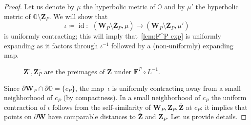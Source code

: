 \documentclass{amsart}
\renewcommand{\sp}{{\ \ }}
\newcommand{\1}{{\mathbb 1 }}
\newcommand{\bO}{{\mathbb{O}}}
\newcommand{\bF}{{\mathbf F}}
\newcommand{\bZ}{{\mathbf Z}}
\newcommand{\bW}{{\mathbf W}}
\newcommand{\bR}{{\mathbf R}}
\theoremstyle{remark}
\numberwithin{equation}{section}
\theoremstyle{definition}
\newcommand{\id}{\operatorname{id}}
\theoremstyle{nonumberbreak}
\begin{document}
\begin{proof}
Let us denote by $\mu$ the hyperbolic metric of $\bO$ and by $\mu'$ the hyperbolic metric of $\bO \setminus \overline \bZ_P$. We will show that \[\iota\coloneqq \id\colon \sp (\bW_P\setminus \overline \bZ_P, \mu)\to (\bW_P\setminus \overline \bZ_P, \mu') \]
is uniformly contracting; this will imply that~\eqref{lem:F^P exp} is uniformly expanding as it factors through $\iota^{-1}$ followed by a (non-uniformly) expanding map. 




\begin{figure}

\caption{$\bZ^\circ,\bZ_P^\circ$ are the preimages of $\bZ$ under $\bF^P\circ L^{-1}$. }
\label{Fig:Z circ}
\end{figure}

Since $\partial \bW_P\cap \partial \bO=\{c_P\}$, the map~$\iota$ is uniformly contracting away from a small neighborhood of $c_P$ (by compactness). In a small neighborhood of $c_P$ the uniform contraction of $\iota$ follows from the self-similarity of $\bW_P,\bZ_P, \overline \bZ$ at $c_P$; it implies that points on $\partial \bW$ have comparable distances to $\overline \bZ$ and $ \bZ_P$. Let us provide details.


\end{proof}
\end{document}
